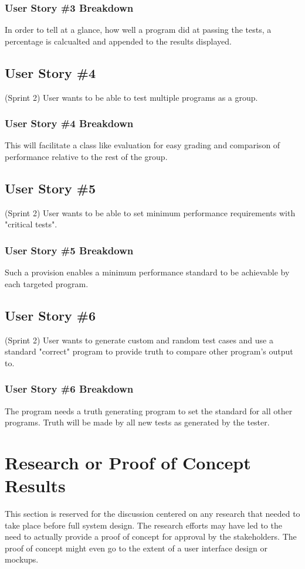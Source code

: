 \subsubsection{User Story \#3 Breakdown}
In order to tell at a glance, how well a program did at passing the tests, a percentage is calcualted and appended to the results displayed.

\subsection{User Story \#4} 
(Sprint 2) User wants to be able to test multiple programs as a group.

\subsubsection{User Story \#4 Breakdown}
This will facilitate a class like evaluation for easy grading and comparison of performance relative to the rest of the group.

\subsection{User Story \#5} 
(Sprint 2) User wants to be able to set minimum performance requirements with "critical tests".

\subsubsection{User Story \#5 Breakdown}
Such a provision enables a minimum performance standard to be achievable by each targeted program.

\subsection{User Story \#6} 
(Sprint 2) User wants to generate custom and random test cases and use a standard "correct" program to provide truth to compare other program's output to.

\subsubsection{User Story \#6 Breakdown}
The program needs a truth generating program to set the standard for all other programs.  Truth will be made by all new tests as generated by the tester.

\section{Research or Proof of Concept Results}
This section is reserved for the discussion centered on any research that needed to take place before full system design.  The research efforts may have led to the need to actually provide a proof of concept for approval by the stakeholders.  The proof of concept might even go to the extent of a user interface design or mockups. 


